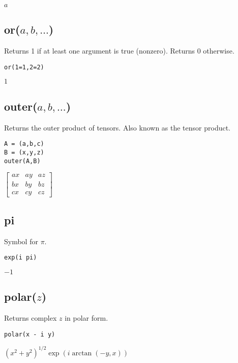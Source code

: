 \noindent
$a$

\subsection*{or($a,b,\ldots$)}

Returns 1 if at least one argument is true (nonzero).
Returns 0 otherwise.

{\color{blue}
\begin{verbatim}
or(1=1,2=2)
\end{verbatim}
}

\noindent
$1$

\subsection*{outer($a,b,\ldots$)}

Returns the outer product of tensors.
Also known as the tensor product.

{\color{blue}
\begin{verbatim}
A = (a,b,c)
B = (x,y,z)
outer(A,B)
\end{verbatim}
}

\noindent
$\displaystyle
\begin{bmatrix}
a x & a y & a z\\
b x & b y & b z\\
c x & c y & c z
\end{bmatrix}
$

\subsection*{pi}

Symbol for $\pi$.

{\color{blue}
\begin{verbatim}
exp(i pi)
\end{verbatim}
}

\noindent
$-1$

\subsection*{polar($z$)}

Returns complex $z$ in polar form.

{\color{blue}
\begin{verbatim}
polar(x - i y)
\end{verbatim}
}

\noindent
$\displaystyle (x^2+y^2)^{1/2}\exp(i\arctan(-y,x))$

